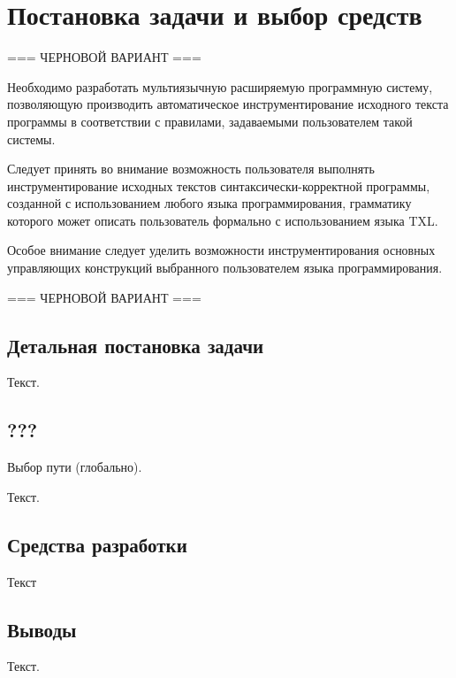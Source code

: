 \chapter{Постановка задачи и выбор средств}

=== ЧЕРНОВОЙ ВАРИАНТ ===

Необходимо разработать мультиязычную расширяемую программную систему, позволяющую производить автоматическое инструментирование исходного текста программы в соответствии с правилами, задаваемыми пользователем такой системы.

Следует принять во внимание возможность пользователя выполнять инструментирование исходных текстов синтаксически-корректной программы, созданной с использованием любого языка программирования, грамматику которого может описать пользователь формально с использованием языка TXL.

Особое внимание следует уделить возможности инструментирования основных управляющих конструкций выбранного пользователем языка программирования.

=== ЧЕРНОВОЙ ВАРИАНТ ===

\section{Детальная постановка задачи}

Текст.

\section{???}

Выбор пути (глобально).

Текст.


\section{Средства разработки}

Текст

\section{Выводы}

Текст.
